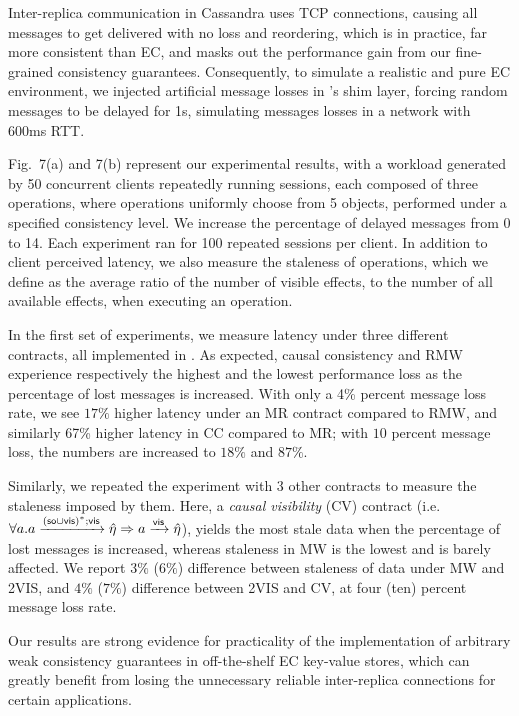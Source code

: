 \documentclass[authorversion]{sig-alternate-05-2015}
\begin{document}
Inter-replica communication in Cassandra uses TCP connections, causing
all messages to get delivered with no loss and reordering, which is in
practice, far more consistent than EC, and masks out the performance
gain from our fine-grained consistency guarantees.  Consequently, to
simulate a realistic and pure EC environment, we injected artificial message
losses in \tool's shim layer, forcing random messages to be delayed
for 1s, simulating messages losses in a network with 600ms RTT.


Fig.~7(a) and 7(b) represent
our experimental results, with a workload generated
by 50 concurrent clients repeatedly running sessions, each composed of three
operations, where operations uniformly choose from 5 objects,
performed under a specified consistency level.
We increase the
percentage of delayed messages from 0 to 14.  Each experiment ran for
100 repeated sessions per client. In addition to client perceived
latency, we also measure the staleness of operations, which we define as
the average ratio of the number of visible effects,
to the number of all available effects, when executing an operation.

In the first set of experiments, we measure latency under
three different contracts, all implemented in \tool. As
expected,
causal consistency and RMW experience respectively the highest and the
lowest
performance loss as the percentage of lost messages is increased.
With only a 4\% percent message loss rate, we see $17\%$ higher latency under an MR
contract compared to RMW, and similarly 67\% higher latency in CC
compared to MR; with $10$ percent message loss, the numbers are
increased to $18\%$ and $87\%$.

Similarly, we repeated the experiment with 3 other contracts to measure the staleness imposed by them.
Here, a
\emph{causal visibility} (CV) contract (i.e. {\footnotesize $ \forall a.
a\xrightarrow{({\textsf{so}}\cup{\normalfont \textsf{vis}})^*;{\normalfont \textsf{vis}}}\hat{\eta}\Rightarrow a\xrightarrow{{\normalfont \textsf{vis}}}
\hat{\eta} $}), yields the most stale data when the percentage of lost
messages is increased, whereas staleness in MW is the lowest and is
barely affected. We report $3\%$ ($6\%$) difference
between staleness of data under MW and 2VIS, and $4\%$ ($7\%$)
difference between 2VIS and CV,
at four (ten) percent message
loss rate.

Our results are strong evidence for practicality of the implementation of arbitrary weak consistency guarantees 
in off-the-shelf EC key-value stores, which can greatly benefit from losing the 
unnecessary reliable inter-replica connections for certain applications.
\end{document}
